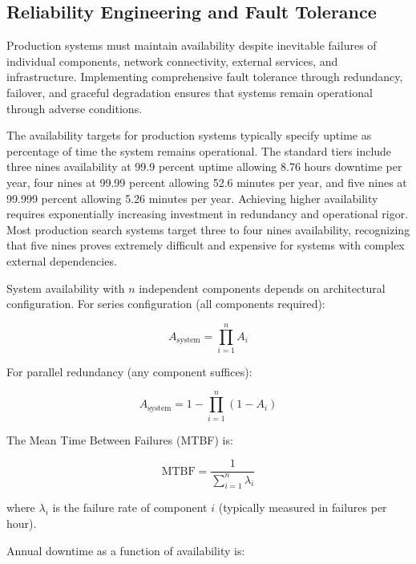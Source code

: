 \subsection{Reliability Engineering and Fault Tolerance}

Production systems must maintain availability despite inevitable failures of individual components, network connectivity, external services, and infrastructure. Implementing comprehensive fault tolerance through redundancy, failover, and graceful degradation ensures that systems remain operational through adverse conditions.

The availability targets for production systems typically specify uptime as percentage of time the system remains operational. The standard tiers include three nines availability at 99.9 percent uptime allowing 8.76 hours downtime per year, four nines at 99.99 percent allowing 52.6 minutes per year, and five nines at 99.999 percent allowing 5.26 minutes per year. Achieving higher availability requires exponentially increasing investment in redundancy and operational rigor. Most production search systems target three to four nines availability, recognizing that five nines proves extremely difficult and expensive for systems with complex external dependencies.

System availability with $n$ independent components depends on architectural configuration. For series configuration (all components required):

\begin{equation}
A_{\text{system}} = \prod_{i=1}^{n} A_i
\label{eq:availability_series}
\end{equation}

For parallel redundancy (any component suffices):

\begin{equation}
A_{\text{system}} = 1 - \prod_{i=1}^{n} (1 - A_i)
\label{eq:availability_parallel}
\end{equation}

The Mean Time Between Failures (MTBF) is:

\begin{equation}
\text{MTBF} = \frac{1}{\sum_{i=1}^{n} \lambda_i}
\label{eq:mtbf}
\end{equation}

where $\lambda_i$ is the failure rate of component $i$ (typically measured in failures per hour).

Annual downtime as a function of availability is:

